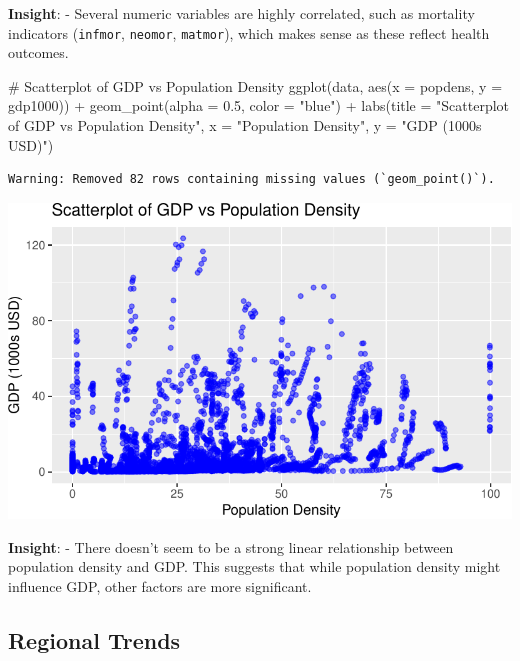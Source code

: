 \documentclass[
  letterpaper,
  DIV=11,
  numbers=noendperiod]{scrartcl}
\newenvironment{Shaded}{\begin{snugshade}}{\end{snugshade}}
\newcommand{\AttributeTok}[1]{\textcolor[rgb]{0.40,0.45,0.13}{#1}}
\newcommand{\CommentTok}[1]{\textcolor[rgb]{0.37,0.37,0.37}{#1}}
\newcommand{\FloatTok}[1]{\textcolor[rgb]{0.68,0.00,0.00}{#1}}
\newcommand{\FunctionTok}[1]{\textcolor[rgb]{0.28,0.35,0.67}{#1}}
\newcommand{\NormalTok}[1]{\textcolor[rgb]{0.00,0.23,0.31}{#1}}
\newcommand{\SpecialCharTok}[1]{\textcolor[rgb]{0.37,0.37,0.37}{#1}}
\newcommand{\StringTok}[1]{\textcolor[rgb]{0.13,0.47,0.30}{#1}}
\begin{document}
\textbf{Insight}: - Several numeric variables are highly correlated,
such as mortality indicators (\texttt{infmor}, \texttt{neomor},
\texttt{matmor}), which makes sense as these reflect health outcomes.

\begin{Shaded}
\begin{Highlighting}[]
\CommentTok{\# Scatterplot of GDP vs Population Density}
\FunctionTok{ggplot}\NormalTok{(data, }\FunctionTok{aes}\NormalTok{(}\AttributeTok{x =}\NormalTok{ popdens, }\AttributeTok{y =}\NormalTok{ gdp1000)) }\SpecialCharTok{+} 
  \FunctionTok{geom\_point}\NormalTok{(}\AttributeTok{alpha =} \FloatTok{0.5}\NormalTok{, }\AttributeTok{color =} \StringTok{"blue"}\NormalTok{) }\SpecialCharTok{+}
  \FunctionTok{labs}\NormalTok{(}\AttributeTok{title =} \StringTok{"Scatterplot of GDP vs Population Density"}\NormalTok{, }\AttributeTok{x =} \StringTok{"Population Density"}\NormalTok{, }\AttributeTok{y =} \StringTok{"GDP (1000s USD)"}\NormalTok{)}
\end{Highlighting}
\end{Shaded}

\begin{verbatim}
Warning: Removed 82 rows containing missing values (`geom_point()`).
\end{verbatim}

\includegraphics{EDA_files/figure-pdf/unnamed-chunk-7-1.pdf}

\textbf{Insight}: - There doesn't seem to be a strong linear
relationship between population density and GDP. This suggests that
while population density might influence GDP, other factors are more
significant.

\subsection{Regional Trends}\label{regional-trends}
\end{document}
